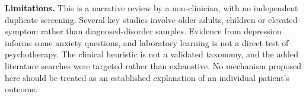 \textbf{Limitations.} This is a narrative review by a non-clinician, with no independent duplicate screening.
Several key studies involve older adults, children or elevated-symptom rather than diagnosed-disorder samples.
Evidence from depression informs some anxiety questions, and laboratory learning is not a direct test of psychotherapy.
The clinical heuristic is not a validated taxonomy, and the added literature searches were targeted rather than exhaustive.
No mechanism proposed here should be treated as an established explanation of an individual patient's outcome.
